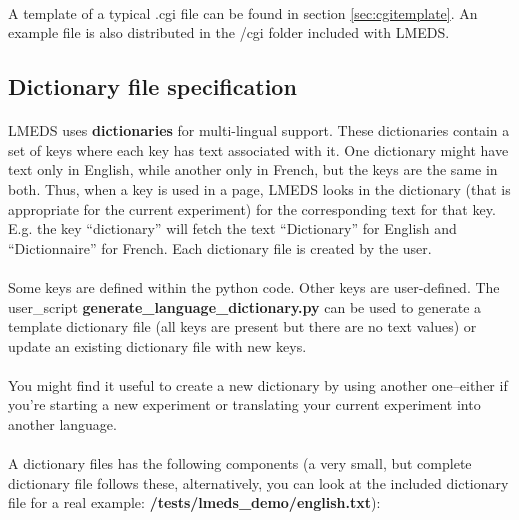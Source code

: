 \paragraph{}
A template of a typical .cgi file can be found in section \ref{sec:cgitemplate}.  An example file is also distributed in the /cgi folder included with LMEDS.

\subsection{Dictionary file specification}
\label{sec:dictionarySpec}

\paragraph{}
LMEDS uses \textbf{dictionaries} for multi-lingual support.  These dictionaries contain a set of keys where each key has text associated with it.  One dictionary might have text only in English, while another only in French, but the keys are the same in both.  Thus, when a key is used in a page, LMEDS looks in the dictionary (that is appropriate for the current experiment) for the corresponding text for that key.  E.g. the key ``dictionary'' will fetch the text ``Dictionary'' for English and  ``Dictionnaire'' for French.  Each dictionary file is created by the user.

\paragraph{}
Some keys are defined within the python code.  Other keys are user-defined.  The user\_script \textbf{generate\_language\_dictionary.py} can be used to generate a template dictionary file (all keys are present but there are no text values) or update an existing dictionary file with new keys.

\paragraph{}
You might find it useful to create a new dictionary by using another one--either if you're starting a new experiment or translating your current experiment into another language.

\paragraph{}
A dictionary files has the following components (a very small, but complete dictionary file follows these, alternatively, you can look at the included dictionary file for a real example: \textbf{/tests/lmeds\_demo/english.txt}):

